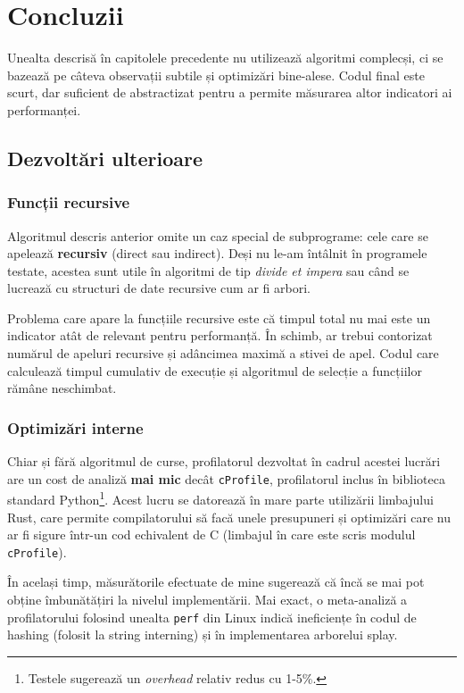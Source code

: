 \chapter{Concluzii}

Unealta descrisă în capitolele precedente nu utilizează algoritmi complecși, ci se bazează pe câteva observații subtile și optimizări bine-alese. Codul final este scurt, dar suficient de abstractizat pentru a permite măsurarea altor indicatori ai performanței.

\section*{Dezvoltări ulterioare}

\subsection*{Funcții recursive}

Algoritmul descris anterior omite un caz special de subprograme: cele care se apelează \textbf{recursiv} (direct sau indirect). Deși nu le-am întâlnit în programele testate, acestea sunt utile în algoritmi de tip \textit{divide et impera} sau când se lucrează cu structuri de date recursive cum ar fi arbori.

Problema care apare la funcțiile recursive este că timpul total nu mai este un indicator atât de relevant pentru performanță. În schimb, ar trebui contorizat numărul de apeluri recursive și adâncimea maximă a stivei de apel. Codul care calculează timpul cumulativ de execuție și algoritmul de selecție a funcțiilor rămâne neschimbat.

\subsection*{Optimizări interne}

Chiar și fără algoritmul de curse, profilatorul dezvoltat în cadrul acestei lucrări are un cost de analiză \textbf{mai mic} decât \texttt{cProfile}, profilatorul inclus în biblioteca standard Python\footnote{Testele sugerează un \textit{overhead} relativ redus cu 1-5\%.}. Acest lucru se datorează în mare parte utilizării limbajului Rust, care permite compilatorului să facă unele presupuneri și optimizări care nu ar fi sigure într-un cod echivalent de C (limbajul în care este scris modulul \texttt{cProfile}).

În același timp, măsurătorile efectuate de mine sugerează că încă se mai pot obține îmbunătățiri la nivelul implementării. Mai exact, o meta-analiză a profilatorului folosind unealta \texttt{perf} din Linux indică ineficiențe în codul de hashing (folosit la string interning) și în implementarea arborelui splay.

